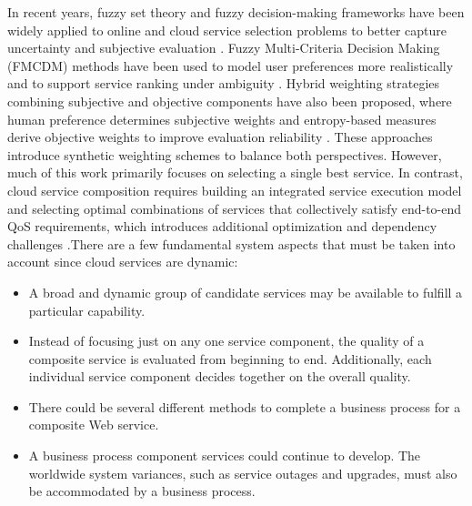 \documentclass[3p,twocolumn]{elsarticle}
\theoremstyle{thmstyleone}%
\theoremstyle{thmstyletwo}%
\theoremstyle{thmstylethree}%
\begin{document}
In recent years, fuzzy set theory and fuzzy decision-making frameworks have been widely applied to online and cloud service selection problems to better capture uncertainty and subjective evaluation \cite{bagga2019qos}. Fuzzy Multi-Criteria Decision Making (FMCDM) methods have been used to model user preferences more realistically and to support service ranking under ambiguity \cite{chen2003fuzzy}. Hybrid weighting strategies combining subjective and objective components have also been proposed, where human preference determines subjective weights and entropy-based measures derive objective weights to improve evaluation reliability \cite{xiong2007qos}. These approaches introduce synthetic weighting schemes to balance both perspectives. However, much of this work primarily focuses on selecting a single best service. In contrast, cloud service composition requires building an integrated service execution model and selecting optimal combinations of services that collectively satisfy end-to-end QoS requirements, which introduces additional optimization and dependency challenges \cite{yu2005service}.There are a few fundamental system aspects that must be taken into account since cloud services are dynamic:
 
 \begin{itemize}
 	\item A broad and dynamic group of candidate services may be available to fulfill a particular capability.
 	\item Instead of focusing just on any one service component, the quality of a composite service is evaluated from beginning to end. Additionally, each individual service component decides together on the overall quality.
 	\item There could be several different methods to complete a business process for a composite Web service.
 	\item A business process component services could continue to develop. The worldwide system variances, such as service outages and upgrades, must also be accommodated by a business process.
 \end{itemize}
 
\end{document}
